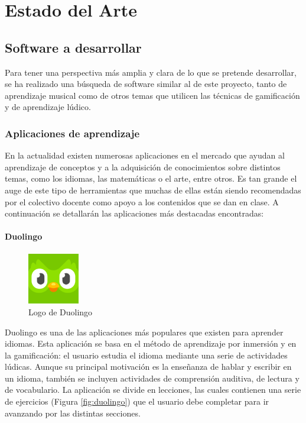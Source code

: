 \chapter{Estado del Arte}
\section{Software a desarrollar}
Para tener una perspectiva más amplia y clara de lo que se pretende desarrollar, se ha realizado una búsqueda de software similar al de este proyecto,
tanto de aprendizaje musical como de otros temas que utilicen las técnicas de gamificación y de aprendizaje lúdico.

\subsection{Aplicaciones de aprendizaje}
En la actualidad existen numerosas aplicaciones en el mercado que ayudan al aprendizaje de conceptos y a la adquisición de conocimientos sobre distintos temas, 
como los idiomas, las matemáticas o el arte, entre otros. Es tan grande el auge de este tipo de herramientas que muchas de ellas están siendo
recomendadas por el colectivo docente como apoyo a los contenidos que se dan en clase. A continuación se
detallarán las aplicaciones más destacadas encontradas:

\subsubsection{Duolingo}
\begin{figure}
    \vspace*{-0.4cm}
    \centering
    \includegraphics[width=0.2\textwidth]{imagenes/c2/duolingo.png}
    \caption{Logo de Duolingo}
    \vspace*{-0.15cm}
\end{figure}

Duolingo es una de las aplicaciones más populares que existen para aprender idiomas. Esta aplicación se basa en el método
de aprendizaje por inmersión y en la gamificación: el usuario estudia el idioma mediante una serie de actividades lúdicas.
Aunque su principal motivación es la enseñanza de hablar y escribir en un idioma, también se incluyen actividades de
comprensión auditiva, de lectura y de vocabulario.
\newpage
La aplicación se divide en lecciones, las cuales contienen una serie de ejercicios (Figura \ref{fig:duolingo}) que el usuario debe
completar para ir avanzando por las distintas secciones.

